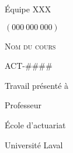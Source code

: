 

% 

\makeatletter
\begin{titlepage}
\centering \large
\begin{flushright}
Équipe XXX
\end{flushright}

\@author
\par
$(000 \ 000 \ 000)$
\vspace{0.5cm}




\vfill


{
\scshape
Nom du cours
\par
ACT-####
}
\vfill


{
\bfseries \Large
\@title
}
\vfill


Travail présenté à
\par
Professeur
\vfill

École d'actuariat
\par
Université Laval
\par 
\@date
\end{titlepage}
\makeatother
